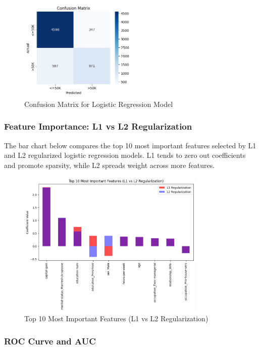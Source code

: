 \documentclass[a4paper,12pt]{article}
\begin{document}
\begin{figure}[H]
    \centering
    \includegraphics[width=0.5\textwidth]{Q3.png}
    \caption{Confusion Matrix for Logistic Regression Model}
\end{figure}
\newpage
\subsubsection*{Feature Importance: L1 vs L2 Regularization}

The bar chart below compares the top 10 most important features selected by L1 and L2 regularized logistic regression models. L1 tends to zero out coefficients and promote sparsity, while L2 spreads weight across more features.

\begin{figure}[H]
    \centering
    \includegraphics[width=0.8\textwidth]{Q3_1.png}
    \caption{Top 10 Most Important Features (L1 vs L2 Regularization)}
\end{figure}
\newpage
\subsubsection*{ROC Curve and AUC}
\end{document}
